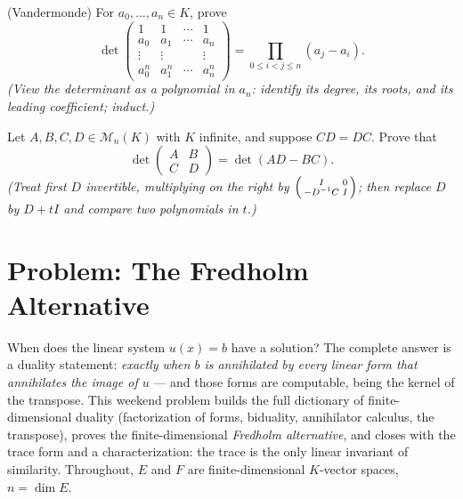 \begin{exercise}[$\star\star$]\label{exo:b2:linalg:11}
(Vandermonde) For $a_0, \dots, a_n \in K$, prove
\[
\det\begin{pmatrix}
1 & 1 & \cdots & 1\\
a_0 & a_1 & \cdots & a_n\\
\vdots & \vdots & & \vdots\\
a_0^n & a_1^n & \cdots & a_n^n
\end{pmatrix}
= \prod_{0 \leq i < j \leq n} (a_j - a_i).
\]
\emph{(View the determinant as a polynomial in $a_n$: identify its
degree, its roots, and its leading coefficient; induct.)}
\end{exercise}

\begin{exercise}[$\star\star\star$]\label{exo:b2:linalg:12}
Let $A, B, C, D \in \mathcal{M}_n(K)$ with $K$ infinite, and
suppose $CD = DC$. Prove that
\[
\det\begin{pmatrix} A & B\\ C & D\end{pmatrix}
= \det(AD - BC).
\]
\emph{(Treat first $D$ invertible, multiplying on the right by
$\begin{psmallmatrix} I & 0\\ -D^{-1}C & I\end{psmallmatrix}$;
then replace $D$ by $D + tI$ and compare two polynomials in $t$.)}
\end{exercise}

\section{Problem: The Fredholm Alternative}

When does the linear system $u(x) = b$ have a solution? The
complete answer is a duality statement: \emph{exactly when $b$ is
annihilated by every linear form that annihilates the image of
$u$} --- and those forms are computable, being the kernel of the
transpose. This weekend problem builds the full dictionary of
finite-dimensional duality (factorization of forms, biduality,
annihilator calculus, the transpose), proves the
finite-dimensional \emph{Fredholm alternative}, and closes with
the trace form and a characterization: the trace is the only
linear invariant of similarity. Throughout, $E$ and $F$ are
finite-dimensional $K$-vector spaces, $n = \dim E$.

